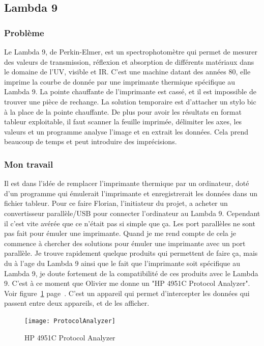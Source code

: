\documentclass[a4paper, 12pt]{article}
\begin{document}
\subsection{ Lambda 9 }

\subsubsection{ Problème }

Le Lambda 9, de Perkin-Elmer, est un spectrophotomètre qui permet de mesurer des valeurs de transmission, réflexion et absorption de différents matériaux dans le domaine de l'UV, visible et IR.  
C'est une machine datant des années 80, elle imprime la courbe de donnée par une imprimante thermique spécifique au Lambda 9.
La pointe chauffante de l'imprimante est cassé, et il est impossible de trouver une pièce de rechange.
La solution temporaire est d'attacher un stylo bic à la place de la pointe chauffante.  
De plus pour avoir les résultats en format tableur exploitable, il faut scanner la feuille imprimée, délimiter les axes, les valeurs et un programme analyse l'image et en extrait les données.
Cela prend beaucoup de temps et peut introduire des imprécisions.  

\subsubsection{ Mon travail }

Il est dans l'idée de remplacer l'imprimante thermique par un ordinateur, doté d'un programme qui émulerait l'imprimante et enregistrerait les données dans un fichier tableur.  
Pour ce faire Florian, l'initiateur du projet, a acheter un convertisseur parallèle/USB pour connecter l'ordinateur au Lambda 9.
Cependant il c'est vite avérée que ce n'était pas si simple que ça.  
Les port parallèles ne sont pas fait pour émuler une imprimante.
Quand je me rend compte de cela je commence à chercher des solutions pour émuler une imprimante avec un port parallèle.
Je trouve rapidement quelque produits qui permettent de faire ça, mais du à l'age du Lambda 9 ainsi que le fait que l'imprimante soit spécifique au Lambda 9, je doute fortement de la compatibilité de ces produits avec le Lambda 9.  
C'est à ce moment que Olivier me donne un "HP 4951C Protocol Analyzer".
Voir figure~\ref{fig:protocolAnalyzer} page~\pageref{fig:protocolAnalyzer}.
C'est un appareil qui permet d'intercepter les données qui passent entre deux appareils, et de les afficher.

\begin{figure}[h]
	\centering
	\texttt{[image: ProtocolAnalyzer]}
	\caption{HP 4951C Protocol Analyzer}
	\label{fig:protocolAnalyzer}
\end{figure}
\end{document}
